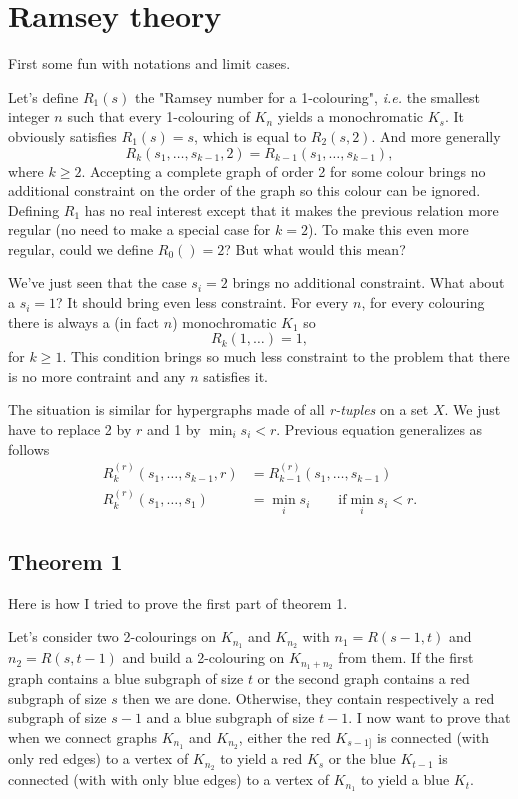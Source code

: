 \section{Ramsey theory}

First some fun with notations and limit cases.

Let's define $R_1(s)$ the "Ramsey number for a 1-colouring",
\textit{i.e.} the smallest integer $n$ such that every 1-colouring of $K_n$ yields a monochromatic $K_s$.
It obviously satisfies $R_1(s) = s$, which is equal to $R_2(s,2)$. And more generally
\begin{equation}
    R_k(s_1,\dots,s_{k-1},2) = R_{k-1}(s_1,\dots,s_{k-1}) ,
\end{equation}
where $k \geq 2$. Accepting a complete graph of order 2 for some colour brings no additional constraint on the order of the graph so this colour can be ignored.
Defining $R_1$ has no real interest except that it makes the previous relation more regular (no need to make a special case for $k=2$).
To make this even more regular, could we define $R_0() = 2$? But what would this mean?

We've just seen that the case $s_i = 2$ brings no additional constraint. What about a $s_i = 1$? It should bring even less constraint.
For every $n$, for every colouring there is always a (in fact $n$) monochromatic $K_1$ so
\begin{equation}
    R_k(1,\dots)=1 ,
\end{equation}
for $k \geq 1$.
This condition brings so much less constraint to the problem that there is no more contraint and any $n$ satisfies it.


The situation is similar for hypergraphs made of all \emph{r-tuples} on a set $X$.
We just have to replace 2 by $r$ and 1 by $\min_i s_i < r$.
Previous equation generalizes as follows
\begin{align}
    R_k^{(r)}(s_1,\dots,s_{k-1},r) & = R_{k-1}^{(r)}(s_1,\dots,s_{k-1}) \\
    R_k^{(r)}(s_1,\dots,s_1) & = \min_i s_i \qquad \text{if} \min_i s_i < r .
\end{align}

\subsection{Theorem 1}

Here is how I tried to prove the first part of theorem 1.

Let's consider two 2-colourings on $K_{n_1}$ and $K_{n_2}$ with $n_1 = R(s-1,t)$ and $n_2 = R(s,t-1)$ and build a 2-colouring on $K_{n_1 + n_2}$ from them.
If the first graph contains a blue subgraph of size $t$ or the second graph contains a red subgraph of size $s$ then we are done.
Otherwise, they contain respectively a red subgraph of size $s-1$ and a blue subgraph of size $t-1$.
I now want to prove that when we connect graphs $K_{n_1}$ and $K_{n_2}$,
either the red $K_{s-1]}$ is connected (with only red edges) to a vertex of $K_{n_2}$ to yield a red $K_s$
or the blue $K_{t-1}$ is connected (with with only blue edges) to a vertex of $K_{n_1}$ to yield a blue $K_t$.

